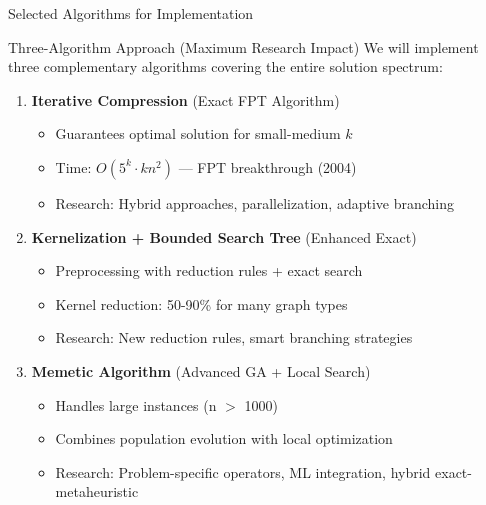\documentclass[aspectratio=169]{beamer}
\renewcommand{\footnotesize}{\tiny}
\begin{document}
\begin{frame}{Selected Algorithms for Implementation}
	\begin{block}{Three-Algorithm Approach (Maximum Research Impact)}
		We will implement three complementary algorithms covering the entire solution spectrum:
	\end{block}

	\vspace{0.3cm}

	\begin{enumerate}
		\item \textbf{Iterative Compression} (Exact FPT Algorithm)
		      \begin{itemize}
			      \footnotesize
			      \item Guarantees optimal solution for small-medium $k$
			      \item Time: $O(5^k \cdot kn^2)$ --- FPT breakthrough (2004)
			      \item Research: Hybrid approaches, parallelization, adaptive branching
		      \end{itemize}

		      \vspace{0.2cm}

		\item \textbf{Kernelization + Bounded Search Tree} (Enhanced Exact)
		      \begin{itemize}
			      \footnotesize
			      \item Preprocessing with reduction rules + exact search
			      \item Kernel reduction: 50-90\% for many graph types
			      \item Research: New reduction rules, smart branching strategies
		      \end{itemize}

		      \vspace{0.2cm}

		\item \textbf{Memetic Algorithm} (Advanced GA + Local Search)
		      \begin{itemize}
			      \footnotesize
			      \item Handles large instances (n $>$ 1000)
			      \item Combines population evolution with local optimization
			      \item Research: Problem-specific operators, ML integration, hybrid exact-metaheuristic
		      \end{itemize}
	\end{enumerate}
\end{frame}
\end{document}
